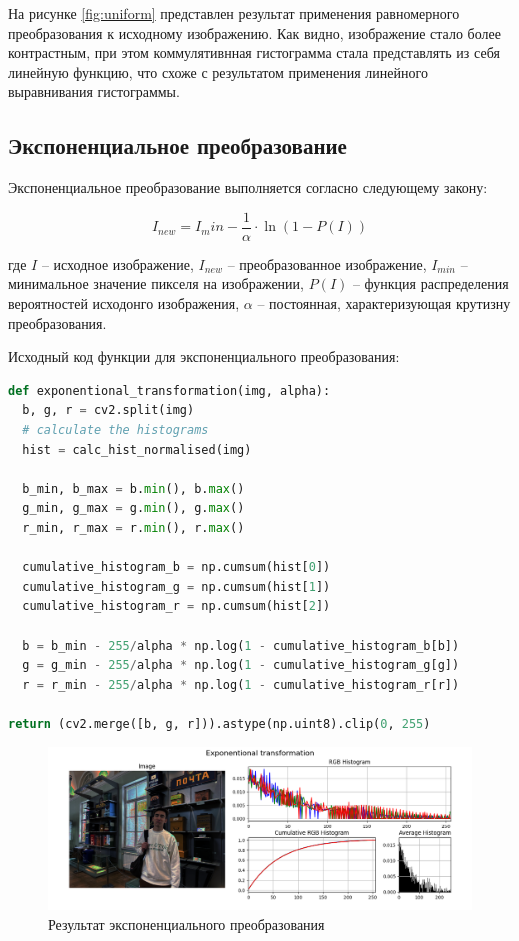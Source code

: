 \documentclass[a4paper, 12pt]{extarticle}
\begin{document}
На рисунке \ref{fig:uniform} представлен результат применения равномерного преобразования к исходному изображению. Как видно, изображение стало более контрастным, при этом коммулятивнная гистограмма стала представлять из себя линейную функцию, что схоже с результатом применения линейного выравнивания гистограммы.


\subsection{Экспоненциальное преобразование}

Экспоненциальное преобразование выполняется согласно следующему закону:

\begin{equation}
  I_{new} = I_min - \frac{1}{\alpha} \cdot \ln(1 - P(I))
\end{equation}

где $I$ -- исходное изображение, $I_{new}$ -- преобразованное изображение, $I_{min}$ -- минимальное значение пикселя на изображении, $P(I)$ -- функция распределения вероятностей исходонго изображения, $\alpha$ -- постоянная, характеризующая крутизну преобразования. 

Исходный код функции для экспоненциального преобразования:

\begin{lstlisting}[language=Python]
def exponentional_transformation(img, alpha):
  b, g, r = cv2.split(img)
  # calculate the histograms
  hist = calc_hist_normalised(img)

  b_min, b_max = b.min(), b.max()
  g_min, g_max = g.min(), g.max()
  r_min, r_max = r.min(), r.max()

  cumulative_histogram_b = np.cumsum(hist[0]) 
  cumulative_histogram_g = np.cumsum(hist[1])
  cumulative_histogram_r = np.cumsum(hist[2])

  b = b_min - 255/alpha * np.log(1 - cumulative_histogram_b[b]) 
  g = g_min - 255/alpha * np.log(1 - cumulative_histogram_g[g]) 
  r = r_min - 255/alpha * np.log(1 - cumulative_histogram_r[r]) 

return (cv2.merge([b, g, r])).astype(np.uint8).clip(0, 255)
\end{lstlisting}

\begin{figure}[h]
    \centering
    \includegraphics[width=\textwidth]{../results/Exponentional transformation.png}
    \caption{Результат экспоненциального преобразования}
    \label{fig:exponentional}
\end{figure}
\end{document}
